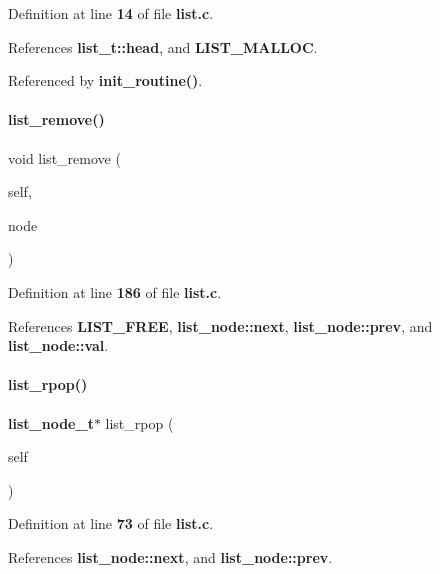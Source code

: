 Definition at line \textbf{ 14} of file \textbf{ list.\+c}.



References \textbf{ list\+\_\+t\+::head}, and \textbf{ L\+I\+S\+T\+\_\+\+M\+A\+L\+L\+OC}.



Referenced by \textbf{ init\+\_\+routine()}.

\mbox{\label{list_8c_a5ef7843a8a481124bce3e93541ba379a}} 
\paragraph{list\+\_\+remove()}
{\footnotesize\ttfamily void list\+\_\+remove (\begin{DoxyParamCaption}\item[{\textbf{ list\+\_\+t} $\ast$}]{self,  }\item[{\textbf{ list\+\_\+node\+\_\+t} $\ast$}]{node }\end{DoxyParamCaption})}



Definition at line \textbf{ 186} of file \textbf{ list.\+c}.



References \textbf{ L\+I\+S\+T\+\_\+\+F\+R\+EE}, \textbf{ list\+\_\+node\+::next}, \textbf{ list\+\_\+node\+::prev}, and \textbf{ list\+\_\+node\+::val}.

\mbox{\label{list_8c_a53460b319b561ce2201bbf95450f1af7}} 
\paragraph{list\+\_\+rpop()}
{\footnotesize\ttfamily \textbf{ list\+\_\+node\+\_\+t}$\ast$ list\+\_\+rpop (\begin{DoxyParamCaption}\item[{\textbf{ list\+\_\+t} $\ast$}]{self }\end{DoxyParamCaption})}



Definition at line \textbf{ 73} of file \textbf{ list.\+c}.



References \textbf{ list\+\_\+node\+::next}, and \textbf{ list\+\_\+node\+::prev}.

\mbox{\label{list_8c_a4edfa9b7742154bff4fc2cb05d044af9}} 

